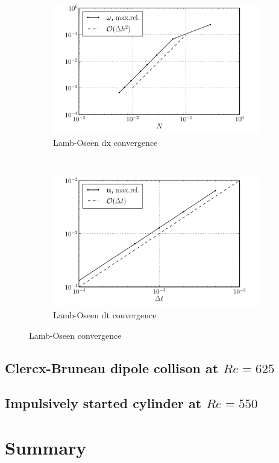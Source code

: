 	\begin{figure}[b]
        \centering
        \begin{subfigure}[b]{0.5\textwidth}
                \includegraphics[width=\textwidth]{figures/eulerian/lambOseen_eulerianConvergence_dx_compressed.pdf}
                \caption{Lamb-Oseen dx convergence}
                \label{fig:lambOseen_eulerianConvergence_dx}
        \end{subfigure}%
        ~ %
        \begin{subfigure}[b]{0.5\textwidth}
                \includegraphics[width=\textwidth]{figures/eulerian/lambOseen_eulerianConvergence_dt_compressed.pdf}
                \caption{Lamb-Oseen dt convergence}
                \label{fig:lambOseen_eulerianConvergence_dt}
        \end{subfigure}
        \caption{Lamb-Oseen convergence}
        \label{fig:lambOseen_eulerianConvergence}
	\end{figure}	

\subsection{Clercx-Bruneau dipole collison at $Re=625$}

\subsection{Impulsively started cylinder at $Re=550$}

\section{Summary}

